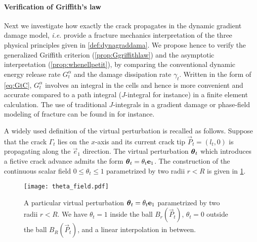 \paragraph{Verification of Griffith's law} Next we investigate how exactly the crack propagates in the dynamic gradient damage model, \emph{i.e.} provide a fracture mechanics interpretation of the three physical principles given in \cref{def:dynagraddama}. We propose hence to verify the generalized Griffith criterion (\cref{prop:Ggriffithlaw}) and the asymptotic interpretation (\cref{prop:whenellpetit}), by comparing the conventional dynamic energy release rate $G^\alpha_t$ and the damage dissipation rate $\gamma_t$. Written in the form of \eqref{eq:GtC}, $G^\alpha_t$ involves an integral in the cells and hence is more convenient and accurate compared to a path integral ($J$-integral for instance) in a finite element calculation. The use of traditional $J$-integrals in a gradient damage or phase-field modeling of fracture can be found in \cite{HossainHsuehBourdinBhattachary:2014,KlinsmannRosatoKamlahMcMeeking:2015} for instance.

A widely used definition of the virtual perturbation \cite{DestuynderDjaouaLescure:1983} is recalled as follows. Suppose that the crack $\Gamma_t$ lies on the $x$-axis and its current crack tip $\vec{P}_t=(l_t,0)$ is propagating along the $\vec{e}_1$ direction. The virtual perturbation $\vtheta_t$ which introduces a fictive crack advance admits the form $\vtheta_t=\theta_t\vec{e}_1$. The construction of the continuous scalar field $0\leq\theta_t\leq 1$ parametrized by two radii $r<R$ is given in \cref{fig:theta}.
\begin{figure}[htbp]
\centering
\texttt{[image: theta\_field.pdf]}
\caption{A particular virtual perturbation $\vtheta_t=\theta_t\vec{e}_1$ parametrized by two radii $r<R$. We have $\theta_t=1$ inside the ball $B_r(\vec{P}_t)$, $\theta_t=0$ outside the ball $B_R(\vec{P}_t)$, and a linear interpolation in between.} \label{fig:theta}
\end{figure}


